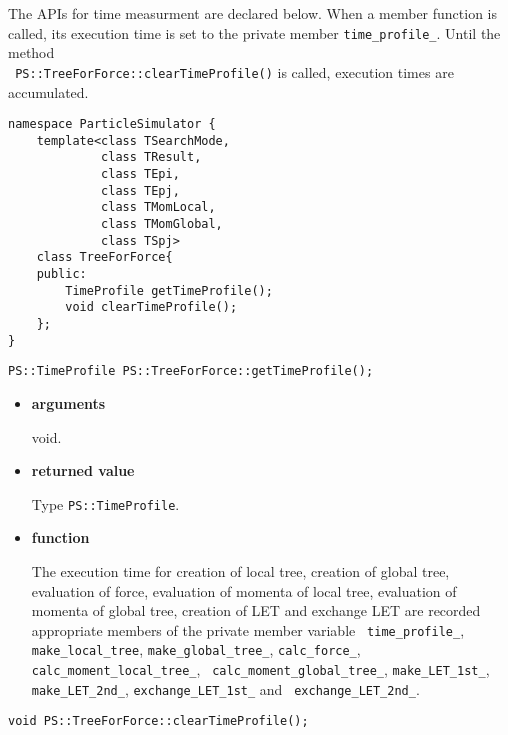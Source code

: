 The APIs for time measurment are declared below. When a member
function is called, its execution time is set to the private member
{\tt time\_profile\_}. Until the method \\ {\tt
PS::TreeForForce::clearTimeProfile()} is called, execution times are
accumulated.

\begin{lstlisting}[caption=TreeForForce2]
namespace ParticleSimulator {
    template<class TSearchMode,
             class TResult,
             class TEpi,
             class TEpj,
             class TMomLocal,
             class TMomGlobal,
             class TSpj>
    class TreeForForce{
    public:
        TimeProfile getTimeProfile();
        void clearTimeProfile();
    };
}
\end{lstlisting}

\begin{screen}
\begin{verbatim}
PS::TimeProfile PS::TreeForForce::getTimeProfile();
\end{verbatim}
\end{screen}

\begin{itemize}

\item {\bf arguments}

void.

\item {\bf returned value}

Type {\tt PS::TimeProfile}.

\item {\bf function}

The execution time for creation of local tree, creation of global
tree, evaluation of force, evaluation of momenta of local tree,
evaluation of momenta of global tree, creation of LET and exchange LET
are recorded appropriate members of the private member variable {\tt
time\_profile\_}, {\tt make\_local\_tree}, {\tt make\_global\_tree\_},
{\tt calc\_force\_}, {\tt calc\_moment\_local\_tree\_}, {\tt
calc\_moment\_global\_tree\_}, {\tt make\_LET\_1st\_}, {\tt
make\_LET\_2nd\_}, {\tt exchange\_LET\_1st\_} and {\tt
exchange\_LET\_2nd\_}.

\end{itemize}

\begin{screen}
\begin{verbatim}
void PS::TreeForForce::clearTimeProfile();
\end{verbatim}
\end{screen}

